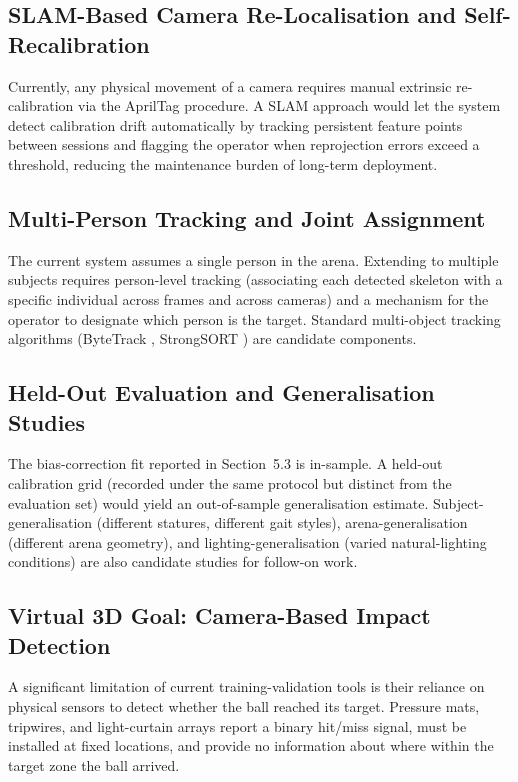 \subsection{SLAM-Based Camera Re-Localisation and Self-Recalibration}

Currently, any physical movement of a camera requires manual extrinsic re-calibration via the AprilTag procedure. A SLAM \cite{ref36} approach would let the system detect calibration drift automatically by tracking persistent feature points between sessions and flagging the operator when reprojection errors exceed a threshold, reducing the maintenance burden of long-term deployment.

\subsection{Multi-Person Tracking and Joint Assignment}

The current system assumes a single person in the arena. Extending to multiple subjects requires person-level tracking (associating each detected skeleton with a specific individual across frames and across cameras) and a mechanism for the operator to designate which person is the target. Standard multi-object tracking algorithms (ByteTrack \cite{ref33}, StrongSORT \cite{ref34}) are candidate components.

\subsection{Held-Out Evaluation and Generalisation Studies}

The bias-correction fit reported in Section~5.3 is in-sample. A held-out calibration grid (recorded under the same protocol but distinct from the evaluation set) would yield an out-of-sample generalisation estimate. Subject-generalisation (different statures, different gait styles), arena-generalisation (different arena geometry), and lighting-generalisation (varied natural-lighting conditions) are also candidate studies for follow-on work.

\subsection{Virtual 3D Goal: Camera-Based Impact Detection}

A significant limitation of current training-validation tools is their reliance on physical sensors to detect whether the ball reached its target. Pressure mats, tripwires, and light-curtain arrays report a binary hit/miss signal, must be installed at fixed locations, and provide no information about where within the target zone the ball arrived.

